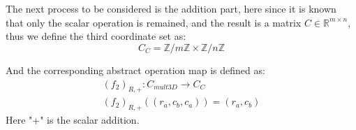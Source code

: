 \documentclass{amsart}
\theoremstyle{definition}
\theoremstyle{remark}
\numberwithin{equation}{section}
\begin{document}
~\\
~\\
\par
The next process to be considered is the addition part, here since it is known that only the scalar operation is remained, and the result is a matrix $C\in \mathbb{R}^{m\times n}$, thus we define the third coordinate set as:
\begin{equation}
C_C=\mathbb{Z}/{m\mathbb{Z}}\times \mathbb{Z}/{n\mathbb{Z}}
\end{equation}\par
And the corresponding abstract operation map is defined as:
\begin{equation}
\begin{array}{l}  
             (f_2)_{R,+}:C_{mult3D}\to C_C\\ 
             (f_2)_{R,+}((r_a,c_b,c_a))=(r_a,c_b)
\end{array}
\end{equation}
Here "+" is the scalar addition.
\end{document}
